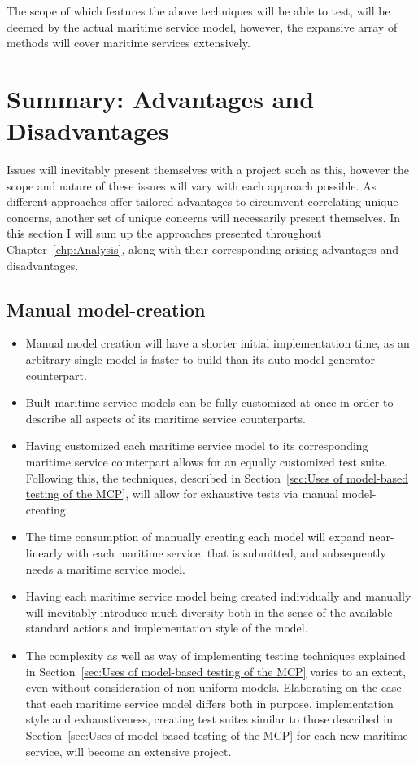 The scope of which features the above techniques will be able to test, will be deemed by the actual maritime service model, however, the expansive array of methods will cover maritime services extensively.
\section{Summary: Advantages and Disadvantages} 
Issues will inevitably present themselves with a project such as this, however the scope and nature of these issues will vary with each approach possible. As different approaches offer tailored advantages to circumvent correlating unique concerns, another set of unique concerns will necessarily present themselves. In this section I will sum up the approaches presented throughout Chapter~\ref{chp:Analysis}, along with their corresponding arising advantages and disadvantages.
\subsection{Manual model-creation}
\begin{itemize}
	\item Manual model creation will have a shorter initial implementation time, as an arbitrary single model is faster to build than its auto-model-generator counterpart. 
	\item Built maritime service models can be fully customized at once in order to describe all aspects of its maritime service counterparts.
	\item Having customized each maritime service model to its corresponding maritime service counterpart allows for an equally customized test suite. Following this, the techniques, described in Section~\ref{sec:Uses of model-based testing of the MCP}, will allow for exhaustive tests via manual model-creating.
\end{itemize}
\begin{itemize}
	\item The time consumption of manually creating each model will expand near-linearly with each maritime service, that is submitted, and subsequently needs a maritime service model. 
	\item Having each maritime service model being created individually and manually will inevitably introduce much diversity both in the sense of the available standard actions and implementation style of the model.
	\item The complexity as well as way of implementing testing techniques explained in Section~\ref{sec:Uses of model-based testing of the MCP} varies to an extent, even without consideration of non-uniform models. Elaborating on the case that each maritime service model differs both in purpose, implementation style and exhaustiveness, creating test suites similar to those described in Section~\ref{sec:Uses of model-based testing of the MCP} for each new maritime service, will become an extensive project.
\end{itemize}\newpage

